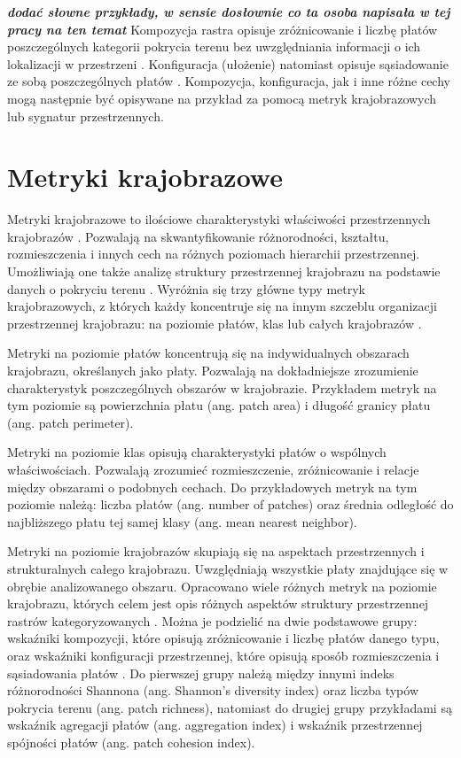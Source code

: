 \documentclass{amuthesis}
\begin{document}
\textbf{\emph{dodać słowne przykłady, w sensie dosłownie co ta osoba
napisała w tej pracy na ten temat}} Kompozycja rastra opisuje
zróżnicowanie i liczbę płatów poszczególnych kategorii pokrycia terenu
bez uwzględniania informacji o ich lokalizacji w przestrzeni
\autocite{Gustafson1998,solon2002,kozak2014}. Konfiguracja (ułożenie)
natomiast opisuje sąsiadowanie ze sobą poszczególnych płatów
\autocite{Gustafson1998,solon2002,kozak2014}. Kompozycja, konfiguracja,
jak i inne różne cechy mogą następnie być opisywane na przykład za
pomocą metryk krajobrazowych lub sygnatur przestrzennych.

\hypertarget{metryki-krajobrazowe}{%
\section{Metryki krajobrazowe}\label{metryki-krajobrazowe}}

Metryki krajobrazowe to ilościowe charakterystyki właściwości
przestrzennych krajobrazów \autocite{McGarigal_fragstats}. Pozwalają na
skwantyfikowanie różnorodności, kształtu, rozmieszczenia i innych cech
na różnych poziomach hierarchii przestrzennej. Umożliwiają one także
analizę struktury przestrzennej krajobrazu na podstawie danych o
pokryciu terenu \autocite{Pukowiec_Kurda_Sobala_2016}. Wyróżnia się trzy
główne typy metryk krajobrazowych, z których każdy koncentruje się na
innym szczeblu organizacji przestrzennej krajobrazu: na poziomie płatów,
klas lub całych krajobrazów \autocite{McGarigal_fragstats}.

Metryki na poziomie płatów koncentrują się na indywidualnych obszarach
krajobrazu, określanych jako płaty. Pozwalają na dokładniejsze
zrozumienie charakterystyk poszczególnych obszarów w krajobrazie.
Przykładem metryk na tym poziomie są powierzchnia płatu (ang. patch
area) i długość granicy płatu (ang. patch perimeter).

Metryki na poziomie klas opisują charakterystyki płatów o wspólnych
właściwościach. Pozwalają zrozumieć rozmieszczenie, zróżnicowanie i
relacje między obszarami o podobnych cechach. Do przykładowych metryk na
tym poziomie należą: liczba płatów (ang. number of patches) oraz średnia
odległość do najbliższego płatu tej samej klasy (ang. mean nearest
neighbor).

Metryki na poziomie krajobrazów skupiają się na aspektach przestrzennych
i strukturalnych całego krajobrazu. Uwzględniają wszystkie płaty
znajdujące się w obrębie analizowanego obszaru. Opracowano wiele różnych
metryk na poziomie krajobrazu, których celem jest opis różnych aspektów
struktury przestrzennej rastrów kategoryzowanych
\autocite{McGarigal_fragstats}. Można je podzielić na dwie podstawowe
grupy: wskaźniki kompozycji, które opisują zróżnicowanie i liczbę płatów
danego typu, oraz wskaźniki konfiguracji przestrzennej, które opisują
sposób rozmieszczenia i sąsiadowania płatów
\autocite{solon2002,kozak2014}. Do pierwszej grupy należą między innymi
indeks różnorodności Shannona (ang. Shannon's diversity index) oraz
liczba typów pokrycia terenu (ang. patch richness), natomiast do drugiej
grupy przykładami są wskaźnik agregacji płatów (ang. aggregation index)
i wskaźnik przestrzennej spójności płatów (ang. patch cohesion index).
\end{document}
